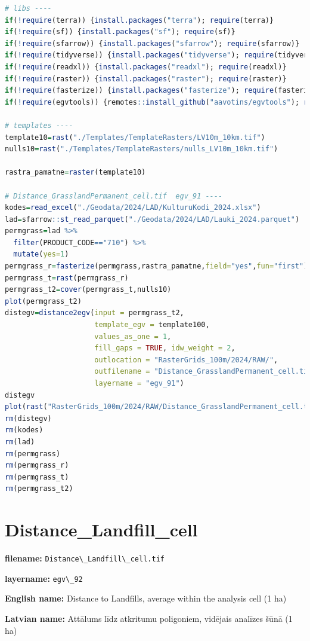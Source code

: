 \documentclass[
]{book}
\newcommand{\passthrough}[1]{#1}
\begin{document}
\begin{lstlisting}[language=R]
# libs ----
if(!require(terra)) {install.packages("terra"); require(terra)}
if(!require(sf)) {install.packages("sf"); require(sf)}
if(!require(sfarrow)) {install.packages("sfarrow"); require(sfarrow)}
if(!require(tidyverse)) {install.packages("tidyverse"); require(tidyverse)}
if(!require(readxl)) {install.packages("readxl"); require(readxl)}
if(!require(raster)) {install.packages("raster"); require(raster)}
if(!require(fasterize)) {install.packages("fasterize"); require(fasterize)}
if(!require(egvtools)) {remotes::install_github("aavotins/egvtools"); require(egvtools)}

# templates ----
template10=rast("./Templates/TemplateRasters/LV10m_10km.tif")
nulls10=rast("./Templates/TemplateRasters/nulls_LV10m_10km.tif")

rastra_pamatne=raster(template10)

# Distance_GrasslandPermanent_cell.tif  egv_91 ----
kodes=read_excel("./Geodata/2024/LAD/KulturuKodi_2024.xlsx")
lad=sfarrow::st_read_parquet("./Geodata/2024/LAD/Lauki_2024.parquet")
permgrass=lad %>% 
  filter(PRODUCT_CODE=="710") %>% 
  mutate(yes=1)
permgrass_r=fasterize(permgrass,rastra_pamatne,field="yes",fun="first")
permgrass_t=rast(permgrass_r)
permgrass_t2=cover(permgrass_t,nulls10)
plot(permgrass_t2)
distegv=distance2egv(input = permgrass_t2,
                     template_egv = template100,
                     values_as_one = 1,
                     fill_gaps = TRUE, idw_weight = 2,
                     outlocation = "RasterGrids_100m/2024/RAW/",
                     outfilename = "Distance_GrasslandPermanent_cell.tif",
                     layername = "egv_91")
distegv
plot(rast("RasterGrids_100m/2024/RAW/Distance_GrasslandPermanent_cell.tif"))
rm(distegv)
rm(kodes)
rm(lad)
rm(permgrass)
rm(permgrass_r)
rm(permgrass_t)
rm(permgrass_t2)
\end{lstlisting}

\section{Distance\_Landfill\_cell}\label{ch06.092}

\textbf{filename:} \passthrough{\lstinline!Distance\_Landfill\_cell.tif!}

\textbf{layername:} \passthrough{\lstinline!egv\_92!}

\textbf{English name:} Distance to Landfills, average within the analysis cell (1 ha)

\textbf{Latvian name:} Attālums līdz atkritumu poligoniem, vidējais analīzes šūnā (1 ha)
\end{document}
